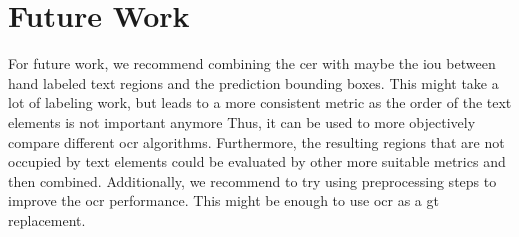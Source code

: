 \section{Future Work}
\label{sec:future}

For future work, we recommend combining the \gls{cer} with maybe the \gls{iou} between hand labeled text regions and the prediction bounding boxes.
This might take a lot of labeling work, but leads to a more consistent metric as the order of the text elements is not important anymore
Thus, it can be used to more objectively compare different \gls{ocr} algorithms.
Furthermore, the resulting regions that are not occupied by text elements could be evaluated by other more suitable metrics and then combined.
Additionally, we recommend to try using preprocessing steps to improve the \gls{ocr} performance.
This might be enough to use \gls{ocr} as a \gls{gt} replacement.
